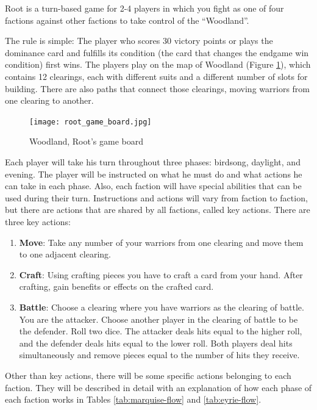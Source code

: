 Root is a turn-based game for 2-4 players in which you fight as one of four factions against other factions to take control of the ``Woodland''.

The rule is simple: The player who scores 30 victory points or plays the dominance card and fulfills its condition (the card that changes the endgame win condition) first wins. The players play on the map of Woodland (Figure \ref{fig:root-game-board}), which contains 12 clearings, each with different suits and a different number of slots for building. There are also paths that connect those clearings, moving warriors from one clearing to another.

\begin{figure}
  \begin{center}
    \texttt{[image: root\_game\_board.jpg]}
  \end{center}
  \caption{Woodland, Root's game board}
  \label{fig:root-game-board}
\end{figure}

Each player will take his turn throughout three phases: birdsong, daylight, and evening. The player will be instructed on what he must do and what actions he can take in each phase. Also, each faction will have special abilities that can be used during their turn. Instructions and actions will vary from faction to faction, but there are actions that are shared by all factions, called key actions. There are three key actions:

\begin{enumerate}
  \item \textbf{Move}: Take any number of your warriors from one clearing and move them to one adjacent clearing.
  \item \textbf{Craft}: Using crafting pieces you have to craft a card from your hand. After crafting, gain benefits or effects on the crafted card.
  \item \textbf{Battle}: Choose a clearing where you have warriors as the clearing of battle. You are the attacker. Choose another player in the clearing of battle to be the defender. Roll two dice. The attacker deals hits equal to the higher roll, and the defender deals hits equal to the lower roll. Both players deal hits simultaneously and remove pieces equal to the number of hits they receive.
\end{enumerate}

Other than key actions, there will be some specific actions belonging to each faction. They will be described in detail with an explanation of how each phase of each faction works in Tables \ref{tab:marquise-flow} and \ref{tab:eyrie-flow}.

